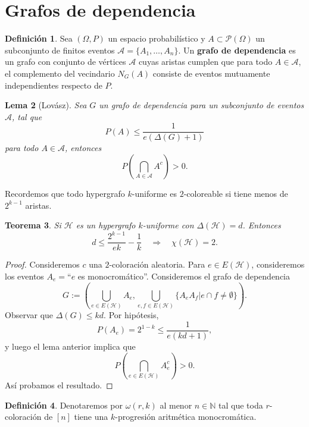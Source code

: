 \documentclass[12pt]{report}
\theoremstyle{plain}
\newtheorem{theorem}{Teorema}[section]
\newtheorem{lemma}[theorem]{Lema}
\theoremstyle{definition}
\newtheorem{definition}[theorem]{Definición}
\newcommand{\naturals}{\mathbb{N}}
\begin{document}
\section{Grafos de dependencia}

\begin{definition}
Sea $(\Omega, P)$ un espacio probabilístico y $A \subset \mathcal P (\Omega)$ un subconjunto de finitos eventos $\mathcal A = \{A_1, \ldots, A_n\}$. Un \textbf{grafo de dependencia} es un grafo con conjunto de vértices $\mathcal A$ cuyas aristas cumplen que para todo $A\in \mathcal A$, el complemento del vecindario $N_G (A)$ consiste de eventos mutuamente independientes respecto de $P$.
\end{definition}

\begin{lemma}[Lovász]\label{lema:lovasz sobre grafo de dependencia}
Sea $G$ un grafo de dependencia para un subconjunto de eventos $\mathcal A$, tal que
\[
    P(A) \leq \frac{1}{e (\Delta (G) + 1)}
\]
para todo $A \in \mathcal A$, entonces
\[
    P(\bigcap_{A \in \mathcal A} A^c) > 0.
\]
\end{lemma}

Recordemos que todo hypergrafo $k$-uniforme es $2$-coloreable si tiene menos de $2^{k-1}$ aristas.

\begin{theorem}
Si $\mathcal H$ es un hypergrafo $k$-uniforme con $\Delta (\mathcal H) =d$. Entonces
\[
    d \leq \frac{2^{k-1}}{ek} - \frac 1 k \quad \Longrightarrow \quad \chi (\mathcal H) = 2.
\]
\end{theorem}
\begin{proof}
Consideremos $c$ una $2$-coloración aleatoria. Para $e \in E(\mathcal H)$, consideremos los eventos $A_e = $``$e$ es monocromático''. Consideremos el grafo de dependencia
\[
    G := \left ( \bigcup_{e \in E (\mathcal H)} A_e, \bigcup_{e,f \in E(\mathcal H)} \{ A_e A_f | e \cap f \neq \emptyset \}\right ).
\]
Observar que $\Delta (G) \leq kd$. Por hipótesis,
\[
    P(A_e) = 2^{1-k} \leq \frac{1}{e (kd + 1)},
\]
y luego el lema anterior implica que
\[
    P (\bigcap_{e \in E (\mathcal H)} A_e^c) >0.
\]
Así probamos el resultado.
\end{proof}


\begin{definition}
Denotaremos por $\omega (r,k)$ al menor $n \in \naturals$ tal que toda $r$-coloración de $[n]$ tiene una $k$-progresión aritmética monocromática.
\end{definition}
\end{document}
